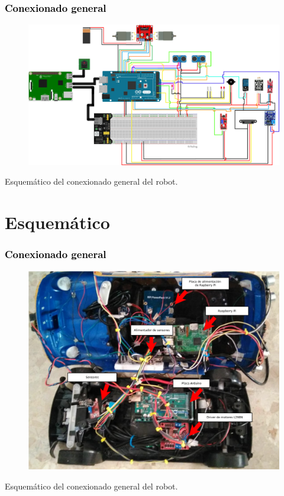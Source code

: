 \documentclass[xcolor=x11names,compress]{beamer}
\theoremstyle{cuadrado}
\begin{document}
\begin{frame}[fragile]
\frametitle{\textcolor{black}{ Conexionado general}}

\begin{figure}%
    \centering
    \includegraphics[scale=0.25]{esquema_general.png}
\end{figure}

\begin{center}
Esquemático del conexionado general del robot.
\end{center}

\end{frame}


\section{Esquemático}

\begin{frame}[fragile]
\frametitle{\textcolor{black}{ Conexionado general}}

\begin{figure}%
    \centering
    \includegraphics[scale=0.18]{conexionado_etiquetas_general.png}
\end{figure}

\begin{center}
Esquemático del conexionado general del robot.
\end{center}

\end{frame}
\end{document}
